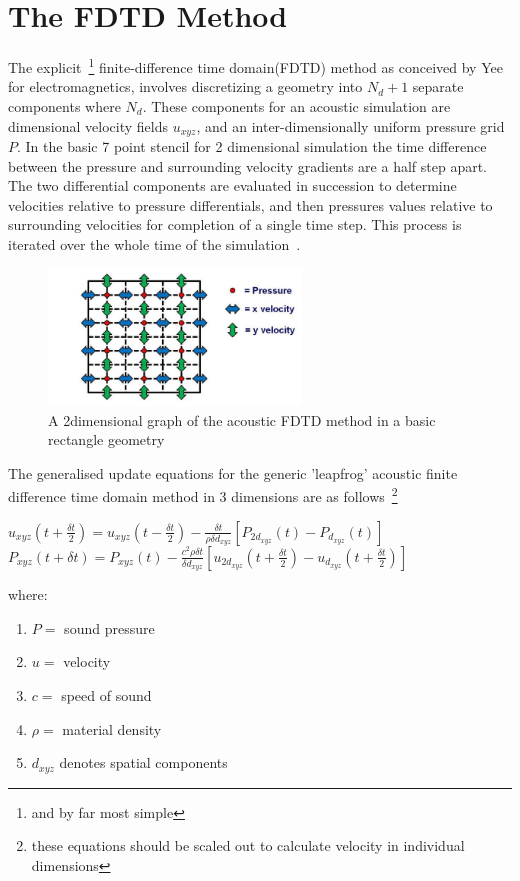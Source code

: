 \documentclass{svproc}
\begin{document}
\section{The FDTD Method}

The explicit~\footnote{and by far most simple} finite-difference time domain(FDTD) method as conceived by Yee~\cite{Yee1966} for electromagnetics, involves discretizing a geometry into $N_d+1$ separate components where $N_d$. These components for an acoustic simulation are dimensional velocity fields $\textit{u}_{xyz}$, and an  inter-dimensionally uniform pressure grid $\textit{P}$. In the basic 7 point stencil for 2 dimensional simulation the time difference between the pressure and surrounding velocity gradients are a half step apart. The two differential components are evaluated in succession to determine velocities relative to pressure differentials, and then pressures values relative to surrounding velocities for completion of a single time step. This process is iterated over the whole time of the simulation~\cite{Schneider2015}.

\begin{figure}
\centering
\includegraphics[width=0.6\textwidth]{2dexplicitfdtdexample.jpg}
\centering
\caption{A 2dimensional graph of the acoustic FDTD method in a basic rectangle geometry~\cite{Hill2012}}
\end{figure}

The generalised update equations for the generic 'leapfrog' acoustic finite difference time domain method in 3 dimensions are as follows~\footnote{these equations should be scaled out to calculate velocity in individual dimensions}

\begin{center}
$u_{xyz}(t + \frac{\delta t}{2}) = u_{xyz}(t - \frac{\delta t}{2}) - \frac{ \delta t}{\rho \delta d_{xyz}} [P_{2d_{xyz}}(t) - P_{d_{xyz}}(t)]$\\
$P_{xyz}(t + \delta t) = P_{xyz}(t) - \frac{ c^2 \rho \delta t}{ \delta d_{xyz}} [u_{2d_{xyz}}(t + \frac{\delta t}{2}) - u_{d_{xyz}}(t + \frac{\delta t}{2})]$\\
\end{center}
where:
\begin{enumerate}
\item $P =$ sound pressure
\item $u =$ velocity
\item $c =$ speed of sound
\item $\rho =$  material density
\item $d_{xyz}$ denotes spatial components 
\end{enumerate}
\end{document}
